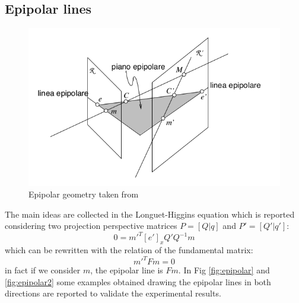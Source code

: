 \documentclass[11pt]{article}
\begin{document}
\subsection{Epipolar lines}
\begin{figure}[H]
    \centering
    \includegraphics[scale=0.4]{images/epipolar.png}
    \caption{Epipolar geometry taken from \cite{Fusiello}}
    \label{fig:epipolar_geom}
\end{figure}
The main ideas are collected in the Longuet-Higgins equation which is reported considering two projection perspective matrices $P = [Q|q]$ and $P' = [Q'|q']$:
\begin{equation}
    0 = m'^T[e']_xQ'Q^{-1}m
\end{equation}
which can be rewritten with the relation of the fundamental matrix:
\begin{equation}
    m'^TFm = 0
\end{equation}
in fact if we consider $m$, the epipolar line is $Fm$. In Fig \ref{fig:epipolar} and \ref{fig:epipolar2} some examples obtained drawing the epipolar lines in both directions are reported to validate the experimental results.
\end{document}
